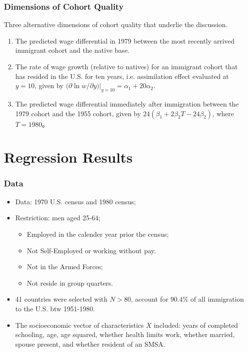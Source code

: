 \documentclass[10pt]{beamer}
\begin{document}
\begin{frame}[c]\frametitle{Dimensions of Cohort Quality}

Three alternative dimensions of cohort quality that underlie the discussion.
\begin{enumerate}
    \item The predicted wage differential in 1979 between the most recently arrived immigrant cohort and the native base.
    \item The rate of wage growth (relative to natives) for an immigrant cohort that has resided in the U.S. for ten years, i.e.  assimilation effect evaluated at $y=10$, given by $\big(\partial \ln w/\partial y\big)|_{y=10}=\alpha_{1} + 20 \alpha_{2}$.
    \item The predicted wage differential immediately after immigration between the 1979 cohort and the 1955 cohort, given by $24(\beta_{1} + 2 \beta_{2}T-24 \beta_{2})$, where $T=1980$。
\end{enumerate}


\end{frame}

\section{Regression Results}
\begin{frame}[c]\frametitle{Data}

\begin{itemize}
    \item Data: 1970 U.S. census and 1980 census;
    \item Restriction: men aged 25-64;
    \begin{itemize}
    \item Employed in the calender year prior the census;
    \item Not Self-Employed or working without pay.
    \item Not in the Armed Forces;
    \item Not reside in group quarters.
    \end{itemize}
    \item 41 countries were selected with $N>80$, account for $90.4\%$ of all immigration to the U.S. btw 1951-1980.
    \item The socioeconomic vector of characteristics $X$ included: years of completed schooling, age, age squared, whether health limits work, whether married, spouse present, and whether resident of an SMSA.
\end{itemize}


\end{frame}
\end{document}
